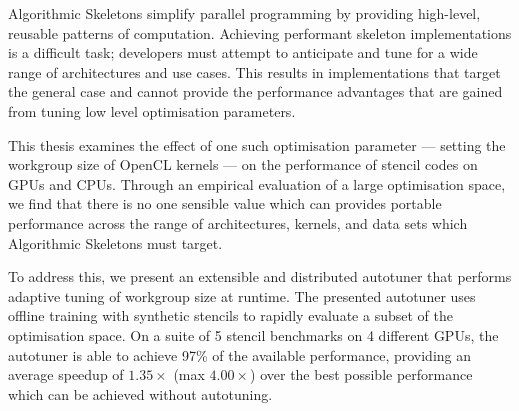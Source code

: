 Algorithmic Skeletons simplify parallel programming by providing
high-level, reusable patterns of computation. Achieving performant
skeleton implementations is a difficult task; developers must attempt
to anticipate and tune for a wide range of architectures and use
cases. This results in implementations that target the general case
and cannot provide the performance advantages that are gained from
tuning low level optimisation parameters.

%
This thesis examines the effect of one such optimisation parameter ---
setting the workgroup size of OpenCL kernels --- on the performance of
stencil codes on GPUs and CPUs. Through an empirical evaluation of a
large optimisation space, we find that there is no one
sensible value which can provides portable performance across the
range of architectures, kernels, and data sets which Algorithmic
Skeletons must target.

%
To address this, we present an extensible and distributed autotuner
that performs adaptive tuning of workgroup size at runtime. The
presented autotuner uses offline training with synthetic stencils to
rapidly evaluate a subset of the optimisation space. On a suite of 5
stencil benchmarks on 4 different GPUs, the autotuner is able to
achieve 97\% of the available performance, providing an average
speedup of $1.35\times$ (max $4.00\times$) over the best possible
performance which can be achieved without autotuning.

